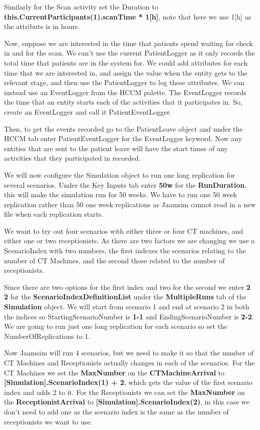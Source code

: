 \documentclass[
  10pt,
  a4paperpaper,
  DIV=11,
  numbers=noendperiod,
  oneside]{scrreprt}
\begin{document}
Similarly for the Scan activity set the Duration to
\textbf{this.CurrentParticipants(1).scanTime * 1{[}h{]}}, note that here
we use 1{[}h{]} as the attribute is in hours.

Now, suppose we are interested in the time that patients spend waiting
for check in and for the scan. We can't use the current PatientLogger as
it only records the total time that patients are in the system for. We
could add attributes for each time that we are interested in, and assign
the value when the entity gets to the relevant stage, and then use the
PatientLogger to log these attributes. We can instead use an EventLogger
from the HCCM palette. The EventLogger records the time that an entity
starts each of the activities that it participates in. So, create an
EventLogger and call it PatientEventLogger.

Then, to get the events recorded go to the PatientLeave object and under
the HCCM tab enter PatientEventLogger for the EventLogger keyword. Now
any entities that are sent to the patient leave will have the start
times of any activities that they participated in recorded.

We will now configure the Simulation object to run one long replication
for several scenarios. Under the Key Inputs tab enter \textbf{50w} for
the \textbf{RunDuration}, this will make the simulation run for 50
weeks. We have to run one 50 week replication rather than 50 one week
replications as Jaamsim cannot read in a new file when each replication
starts.

We want to try out four scenarios with either three or four CT machines,
and either one or two receptionists. As there are two factors we are
changing we use a ScenarioIndex with two numbers, the first indexes the
scenarios relating to the number of CT Machines, and the second those
related to the number of receptionists.

Since there are two options for the first index and two for the second
we enter \textbf{2 2} for the \textbf{ScenarioIndexDefinitionList} under
the \textbf{MultipleRuns} tab of the \textbf{Simulation} object. We will
start from scenario 1 and end at scenario 2 in both the indices so
StartingScenarioNumber is \textbf{1-1} and EndingScenarioNumber is
\textbf{2-2}. We are going to run just one long replication for each
scenario so set the NumberOfReplications to 1.

Now Jaamsim will run 4 scenarios, but we need to make it so that the
number of CT Machines and Receptionists actually changes in each of the
scenarios. For the CT Machines we set the \textbf{MaxNumber} on the
\textbf{CTMachineArrival} to \textbf{{[}Simulation{]}.ScenarioIndex(1) +
2}, which gets the value of the first scenario index and adds 2 to it.
For the Receptionists we can set the \textbf{MaxNumber} on the
\textbf{ReceptionistArrival} to
\textbf{{[}Simulation{]}.ScenarioIndex(2)}, in this case we don't need
to add one as the scenario index is the same as the number of
receptionists we want to use.
\end{document}
